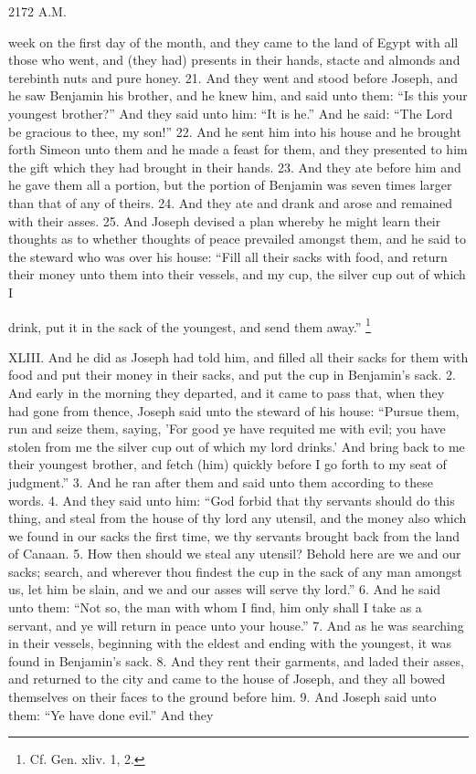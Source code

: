 2172 A.M.

week on the first day of the month, and they came to the land of Egypt with all those who went, and (they had) presents in their hands, stacte and almonds and terebinth nuts and pure honey. 21. And they went and stood before Joseph, and he saw Benjamin his brother, and he knew him, and said unto them: ``Is this your youngest brother?'' And they said unto him: ``It is he.'' And he said: ``The Lord be gracious to thee, my son!'' 22. And he sent him into his house and he brought forth Simeon unto them and he made a feast for them, and they presented to him the gift which they had brought in their hands. 23. And they ate before him and he gave them all a portion, but the portion of Benjamin was seven times larger than that of any of theirs. 24. And they ate and drank and arose and remained with their asses. 25. And Joseph devised a plan whereby he might learn their thoughts as to whether thoughts of peace prevailed amongst them, and he said to the steward who was over his house: ``Fill all their sacks with food, and return their money unto them into their vessels, and my cup, the silver cup out of which I

drink, put it in the sack of the youngest, and send them away.'' \footnote{Cf. Gen. xliv. 1, 2.}


XLIII. And he did as Joseph had told him, and filled all their sacks for them with food and put their money in their sacks, and put the cup in Benjamin's sack. 2. And early in the morning they departed, and it came to pass that, when they had gone from thence, Joseph said unto the steward of his house: ``Pursue them, run and seize them, saying, 'For good ye have requited me with evil; you have stolen from me the silver cup out of which my lord drinks.' And bring back to me their youngest brother, and fetch (him) quickly before I go forth to my seat of judgment.'' 3. And he ran after them and said unto them according to these words. 4. And they said unto him: ``God forbid that thy servants should do this thing, and steal from the house of thy lord any utensil, and the money also which we found in our sacks the first time, we thy servants brought back from the land of Canaan. 5. How then should we steal any utensil? Behold here are we and our sacks; search, and wherever thou findest the cup in the sack of any man amongst us, let him be slain, and we and our asses will serve thy lord.'' 6. And he said unto them: ``Not so, the man with whom I find, him only shall I take as a servant, and ye will return in peace unto your house.'' 7. And as he was searching in their vessels, beginning with the eldest and ending with the youngest, it was found in Benjamin's sack. 8. And they rent their garments, and laded their asses, and returned to the city and came to the house of Joseph, and they all bowed themselves on their faces to the ground before him. 9. And Joseph said unto them: ``Ye have done evil.'' And they

